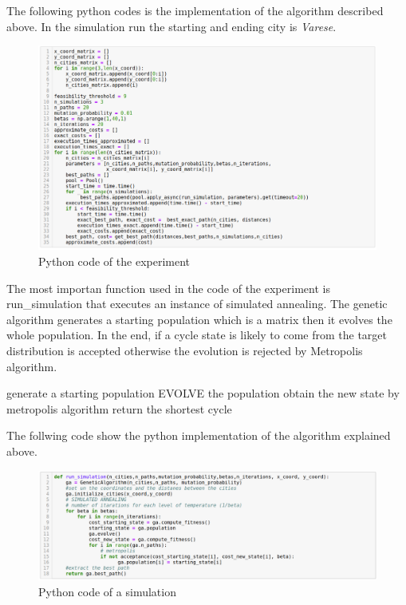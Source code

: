 \documentclass{article}
\begin{document}
\noindent The following python codes is the implementation of the algorithm described above. In the simulation run the starting and ending city is \textit{Varese}. \\
\begin{figure}[H]
\includegraphics[scale=0.5]{simulation.png} 
\centering
\caption{Python code of the experiment}
\end{figure}

\noindent The most importan function used in the code of the experiment is run\_simulation that executes an instance of simulated annealing. The genetic algorithm generates a starting population which is a matrix then it evolves the whole population. In the end, if a cycle state is likely to come from the target distribution is accepted otherwise the evolution is rejected by Metropolis algorithm.

\begin{algorithm}[H]
    \begin{algorithmic}[1]
      \State generate a starting population
       		\State EVOLVE the population
       		\State obtain the new state by metropolis algorithm
       	\EndFor 
       \EndFor
       \State return the shortest cycle
       \EndFunction
\end{algorithmic}
\end{algorithm}

\noindent The follwing code show the python implementation of the algorithm explained above.
\begin{figure}[H]
\includegraphics[scale=0.38]{run_simulation.png} 
\centering
\caption{Python code of a simulation}
\end{figure}
\noindent
\end{document}
